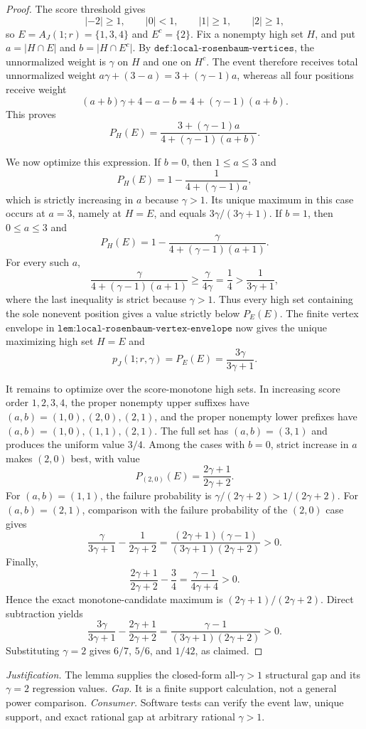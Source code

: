 \documentclass{article}
\begin{document}
\begin{proof}
The score threshold gives
\[
\lvert-2\rvert\ge1,
\qquad
\lvert0\rvert<1,
\qquad
\lvert1\rvert\ge1,
\qquad
\lvert2\rvert\ge1,
\]
so \(E=A_J(1;r)=\{1,3,4\}\) and \(E^c=\{2\}\). Fix a nonempty high set \(H\), and put \(a=\lvert H\cap E\rvert\) and \(b=\lvert H\cap E^c\rvert\). By \(\texttt{def:local-rosenbaum-vertices}\), the unnormalized weight is \(\gamma\) on \(H\) and one on \(H^c\). The event therefore receives total unnormalized weight \(a\gamma+(3-a)=3+(\gamma-1)a\), whereas all four positions receive weight
\[
(a+b)\gamma+4-a-b=4+(\gamma-1)(a+b).
\]
This proves
\[
P_H(E)=\frac{3+(\gamma-1)a}{4+(\gamma-1)(a+b)}.
\]

We now optimize this expression. If \(b=0\), then \(1\le a\le3\) and
\[
P_H(E)=1-\frac{1}{4+(\gamma-1)a},
\]
which is strictly increasing in \(a\) because \(\gamma>1\). Its unique maximum in this case occurs at \(a=3\), namely at \(H=E\), and equals \(3\gamma/(3\gamma+1)\). If \(b=1\), then \(0\le a\le3\) and
\[
P_H(E)=1-\frac{\gamma}{4+(\gamma-1)(a+1)}.
\]
For every such \(a\),
\[
\frac{\gamma}{4+(\gamma-1)(a+1)}
 \ge\frac{\gamma}{4\gamma}
 =\frac14
 >\frac{1}{3\gamma+1},
\]
where the last inequality is strict because \(\gamma>1\). Thus every high set containing the sole nonevent position gives a value strictly below \(P_E(E)\). The finite vertex envelope in \(\texttt{lem:local-rosenbaum-vertex-envelope}\) now gives the unique maximizing high set \(H=E\) and
\[
p_J(1;r,\gamma)=P_E(E)=\frac{3\gamma}{3\gamma+1}.
\]

It remains to optimize over the score-monotone high sets. In increasing score order \(1,2,3,4\), the proper nonempty upper suffixes have \((a,b)=(1,0),(2,0),(2,1)\), and the proper nonempty lower prefixes have \((a,b)=(1,0),(1,1),(2,1)\). The full set has \((a,b)=(3,1)\) and produces the uniform value \(3/4\). Among the cases with \(b=0\), strict increase in \(a\) makes \((2,0)\) best, with value
\[
P_{(2,0)}(E)=\frac{2\gamma+1}{2\gamma+2}.
\]
For \((a,b)=(1,1)\), the failure probability is \(\gamma/(2\gamma+2)>1/(2\gamma+2)\). For \((a,b)=(2,1)\), comparison with the failure probability of the \((2,0)\) case gives
\[
\frac{\gamma}{3\gamma+1}-\frac{1}{2\gamma+2}
 =\frac{(2\gamma+1)(\gamma-1)}{(3\gamma+1)(2\gamma+2)}>0.
\]
Finally,
\[
\frac{2\gamma+1}{2\gamma+2}-\frac34
 =\frac{\gamma-1}{4\gamma+4}>0.
\]
Hence the exact monotone-candidate maximum is \((2\gamma+1)/(2\gamma+2)\). Direct subtraction yields
\[
\frac{3\gamma}{3\gamma+1}-\frac{2\gamma+1}{2\gamma+2}
 =\frac{\gamma-1}{(3\gamma+1)(2\gamma+2)}>0.
\]
Substituting \(\gamma=2\) gives \(6/7\), \(5/6\), and \(1/42\), as claimed.
\end{proof}
\par\smallskip\noindent \textit{Justification.} The lemma supplies the closed-form all-\(\gamma>1\) structural gap and its \(\gamma=2\) regression values. \textit{Gap.} It is a finite support calculation, not a general power comparison. \textit{Consumer.} Software tests can verify the event law, unique support, and exact rational gap at arbitrary rational \(\gamma>1\).
\end{document}

